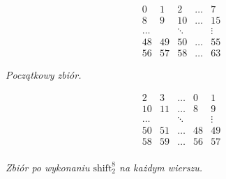 \documentclass[a4paper]{article}
\newcommand{\shift}[2]{\text{shift}_{#2}^{#1}}
\theoremstyle{definition}
\begin{document}
\begin{minipage}{.5\textwidth} %

\[
\begin{matrix}
 0 &  1 &  2 &  \ldots & 7 \\
 8 &  9 & 10 &  \ldots & 15 \\
\ldots & & \ddots &  & \vdots \\
48 & 49 & 50 & \ldots & 55 \\
56 & 57 & 58 & \ldots & 63 
\end{matrix}
\]

\begin{center} \it
    Początkowy zbiór.
\end{center}

\end{minipage} %
\begin{minipage}{.5\textwidth} %

\[
\begin{matrix}
 2  &  3 & \ldots &  0 &  1 \\
 10 & 11 & \ldots &  8 &  9 \\
\ldots & & \ddots &  & \vdots \\
 50 & 51 & \ldots & 48 & 49 \\
 58 & 59 & \ldots & 56 & 57 \\ 
\end{matrix}
\]

\begin{center} \it
    Zbiór po wykonaniu \(\shift 8 2\) na każdym wierszu.
\end{center}
\end{minipage}

\vspace{1em}
\end{document}
